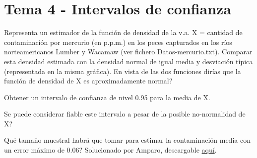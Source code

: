 \section{Tema 4 - Intervalos de confianza}

\begin{problem}[1 y 2]

\ppart Representa un estimador de la función de densidad de la v.a. X = cantidad de contaminación por mercurio (en p.p.m.) en los peces capturados en los ríos norteamericanos Lumber y Wacamaw (ver fichero Datos-mercurio.txt). Comparar esta densidad estimada con la densidad normal de igual media y desviación típica (representada en la misma gráfica). En vista de las dos funciones dirías que la función de densidad de X es aproximadamente normal?

\ppart Obtener un intervalo de confianza de nivel 0.95 para la media de X.

\ppart Se puede considerar fiable este intervalo a pesar de la posible no-normalidad de X?

\ppart Qué tamaño muestral habrá que tomar para estimar la contaminación media con un error máximo de 0.06?
\solution
Solucionado por Amparo, descargable \href{http://www.uam.es/personal_pdi/ciencias/abaillo/MatEstI/T4DatosMercurio.pdf}{aquí}.

\end{problem}

